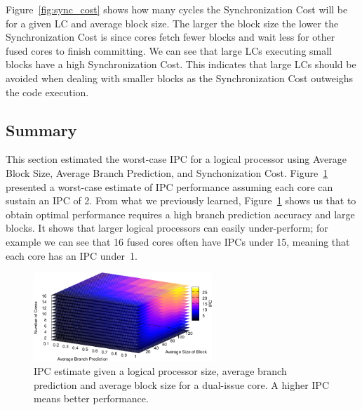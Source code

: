 Figure~\ref{fig:sync_cost} shows how many cycles the Synchronization Cost will be for a given LC and average block size.
The larger the block size the lower the Synchronization Cost is since cores fetch fewer blocks and wait less for other fused cores to finish committing.
We can see that large LCs executing small blocks have a high Synchronization Cost. 
This indicates that large LCs should be avoided when dealing with smaller blocks as the Synchronization Cost outweighs the code execution.

\subsection{Summary}

This section estimated the worst-case IPC for a logical processor using Average Block Size, Average Branch Prediction, and Synchonization Cost.
Figure~\ref{fig:lm_summ} presented a worst-case estimate of IPC performance assuming each core can sustain an IPC of 2.
From what we previously learned, Figure~\ref{fig:lm_summ} shows us that to obtain optimal performance requires a high branch prediction accuracy and large blocks.
It shows that larger logical processors can easily under-perform; for example we can see that 16 fused cores often have IPCs under 15, meaning that each core has an IPC under~1.

\begin{figure}[t]
    \centering
    \includegraphics[width=0.60\textwidth]{cases-paper/graphics/limit_study/summary.pdf}
    \caption{IPC estimate given a logical processor size, average branch prediction and average block size for a dual-issue core. A higher IPC means better performance.}
    \label{fig:lm_summ}
\vspace{5mm}
\end{figure}
